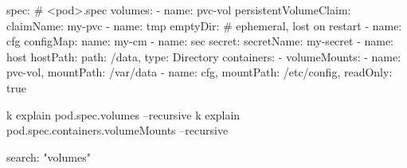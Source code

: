 \begin{tcbitemize}[
  raster columns=2, raster equal height=rows,
  blanker, cheat subtitle
]
\begin{tcbitemize}[
      raster columns=1, raster equal height=rows,
      blanker, cheat subtitle
    ]
        \begin{cheatcodebash}
        spec:                  # <pod>.spec
          volumes:
          - name: pvc-vol
            persistentVolumeClaim:
              claimName: my-pvc
          - name: tmp
            emptyDir: {}           # ephemeral, lost on restart
          - name: cfg
            configMap: {name: my-cm}
          - name: sec
            secret: {secretName: my-secret}
          - name: host
            hostPath: {path: /data, type: Directory}
          containers:
          - volumeMounts:
            - {name: pvc-vol, mountPath: /var/data}
            - {name: cfg, mountPath: /etc/config, readOnly: true}
        \end{cheatcodebash}

        \begin{cheatcodebash}
        k explain pod.spec.volumes --recursive
        k explain pod.spec.containers.volumeMounts --recursive
        \end{cheatcodebash}
        \begin{cheatcodebash}
        search: "volumes"
        \end{cheatcodebash}


      \tcbitem


\end{tcbitemize}
\end{tcbitemize}
